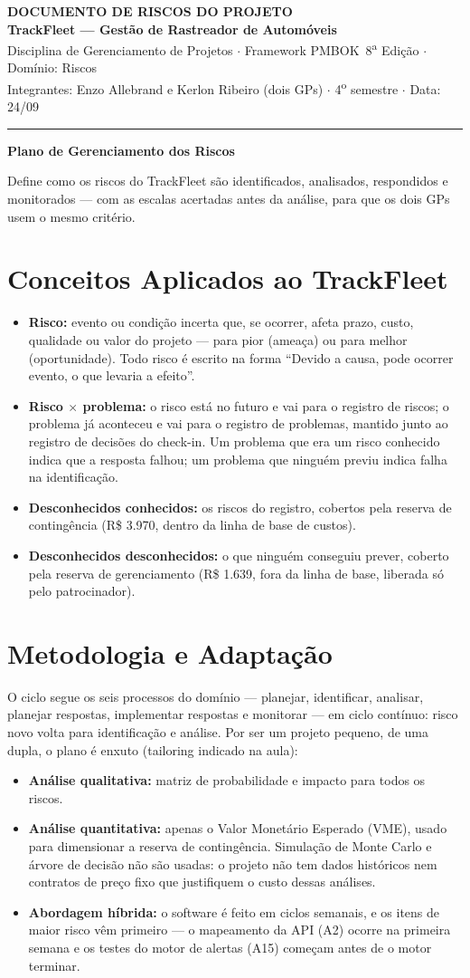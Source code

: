 \documentclass[11pt,a4paper]{article}
\newcommand{\cabecalho}[3]{%
  \begin{center}
  {\Large\bfseries DOCUMENTO DE #1 DO PROJETO}\\[2pt]
  {\large\bfseries TrackFleet --- Gestão de Rastreador de Automóveis}\\[4pt]
  Disciplina de Gerenciamento de Projetos $\cdot$ Framework PMBOK\textregistered\ 8\textsuperscript{a} Edição $\cdot$ Domínio: #2\\[2pt]
  Integrantes: Enzo Allebrand e Kerlon Ribeiro (dois GPs) $\cdot$ 4\textsuperscript{o} semestre $\cdot$ Data: #3
  \end{center}
  \vspace{2mm}\hrule\vspace{4mm}}
\newcommand{\parte}[1]{\noindent\textbf{\large #1}\par\vspace{1mm}}
\begin{document}
\cabecalho{RISCOS}{Riscos}{24/09}

\parte{Plano de Gerenciamento dos Riscos}
\noindent Define como os riscos do TrackFleet são identificados, analisados, respondidos e monitorados --- com as escalas acertadas antes da análise, para que os dois GPs usem o mesmo critério.

\section{Conceitos Aplicados ao TrackFleet}
\begin{itemize}[itemsep=3pt]
  \item \textbf{Risco:} evento ou condição incerta que, se ocorrer, afeta prazo, custo, qualidade ou valor do projeto --- para pior (ameaça) ou para melhor (oportunidade). Todo risco é escrito na forma ``Devido a causa, pode ocorrer evento, o que levaria a efeito''.
  \item \textbf{Risco $\times$ problema:} o risco está no futuro e vai para o registro de riscos; o problema já aconteceu e vai para o registro de problemas, mantido junto ao registro de decisões do check-in. Um problema que era um risco conhecido indica que a resposta falhou; um problema que ninguém previu indica falha na identificação.
  \item \textbf{Desconhecidos conhecidos:} os riscos do registro, cobertos pela reserva de contingência (R\$ 3.970, dentro da linha de base de custos).
  \item \textbf{Desconhecidos desconhecidos:} o que ninguém conseguiu prever, coberto pela reserva de gerenciamento (R\$ 1.639, fora da linha de base, liberada só pelo patrocinador).
\end{itemize}

\section{Metodologia e Adaptação}
O ciclo segue os seis processos do domínio --- planejar, identificar, analisar, planejar respostas, implementar respostas e monitorar --- em ciclo contínuo: risco novo volta para identificação e análise. Por ser um projeto pequeno, de uma dupla, o plano é enxuto (tailoring indicado na aula):
\begin{itemize}[itemsep=2pt]
  \item \textbf{Análise qualitativa:} matriz de probabilidade e impacto para todos os riscos.
  \item \textbf{Análise quantitativa:} apenas o Valor Monetário Esperado (VME), usado para dimensionar a reserva de contingência. Simulação de Monte Carlo e árvore de decisão não são usadas: o projeto não tem dados históricos nem contratos de preço fixo que justifiquem o custo dessas análises.
  \item \textbf{Abordagem híbrida:} o software é feito em ciclos semanais, e os itens de maior risco vêm primeiro --- o mapeamento da API (A2) ocorre na primeira semana e os testes do motor de alertas (A15) começam antes de o motor terminar.
\end{itemize}
\end{document}
